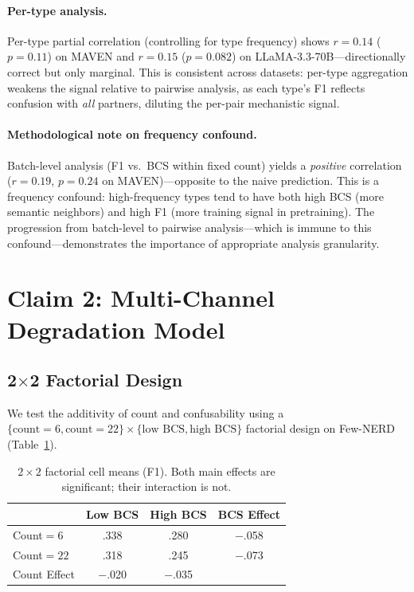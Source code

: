 \documentclass[11pt,a4paper]{article}
\begin{document}
\paragraph{Per-type analysis.}
Per-type partial correlation (controlling for type frequency) shows $r=0.14$ ($p=0.11$) on MAVEN and $r=0.15$ ($p=0.082$) on LLaMA-3.3-70B---directionally correct but only marginal. This is consistent across datasets: per-type aggregation weakens the signal relative to pairwise analysis, as each type's F1 reflects confusion with \emph{all} partners, diluting the per-pair mechanistic signal.

\paragraph{Methodological note on frequency confound.}
Batch-level analysis (F1 vs.\ BCS within fixed count) yields a \emph{positive} correlation ($r=0.19$, $p=0.24$ on MAVEN)---opposite to the naive prediction. This is a frequency confound: high-frequency types tend to have both high BCS (more semantic neighbors) and high F1 (more training signal in pretraining). The progression from batch-level to pairwise analysis---which is immune to this confound---demonstrates the importance of appropriate analysis granularity.

\section{Claim 2: Multi-Channel Degradation Model}
\label{sec:claim2}

\subsection{2$\times$2 Factorial Design}

We test the additivity of count and confusability using a $\{\text{count}=6, \text{count}=22\} \times \{\text{low BCS}, \text{high BCS}\}$ factorial design on Few-NERD (Table~\ref{tab:factorial}).

\begin{table}[t]
\centering
\small
\caption{$2\times2$ factorial cell means (F1). Both main effects are significant; their interaction is not.}
\label{tab:factorial}
\begin{tabular}{lccc}
\toprule
 & Low BCS & High BCS & BCS Effect \\
\midrule
Count$=6$ & .338 & .280 & $-$.058 \\
Count$=22$ & .318 & .245 & $-$.073 \\
\midrule
Count Effect & $-$.020 & $-$.035 & \\
\bottomrule
\end{tabular}
\end{table}
\end{document}
